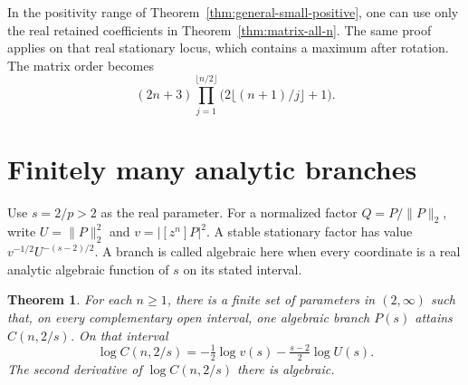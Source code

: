 \documentclass[11pt]{article}
\newtheorem{theorem}{Theorem}
\begin{document}
In the positivity range of Theorem~\ref{thm:general-small-positive},
one can use only the real retained coefficients in
Theorem~\ref{thm:matrix-all-n}. The same proof applies on that real
stationary locus, which contains a maximum after rotation.
The matrix order becomes
\[
 (2n+3)\prod_{j=1}^{\lfloor n/2\rfloor}
        \bigl(2\lfloor(n+1)/j\rfloor+1\bigr).
\]

\section{Finitely many analytic branches}

Use \(s=2/p>2\) as the real parameter. For a normalized factor
\(Q=P/\|P\|_2\), write \(U=\|P\|_2^2\) and
\(v=|[z^n]P|^2\). A stable stationary factor has value
\(v^{-1/2}U^{-(s-2)/2}\). A branch is called algebraic here
when every coordinate is a real analytic algebraic function
of \(s\) on its stated interval.

\begin{theorem}\label{thm:branches}
For each \(n\geq1\), there is a finite set of parameters in
\((2,\infty)\) such that, on every complementary open interval,
one algebraic branch \(P(s)\) attains \(C(n,2/s)\). On that
interval
\[
 \log C(n,2/s)=-\tfrac12\log v(s)-\tfrac{s-2}{2}\log U(s).
\]
The second derivative of \(\log C(n,2/s)\) there is algebraic.
\end{theorem}
\end{document}
